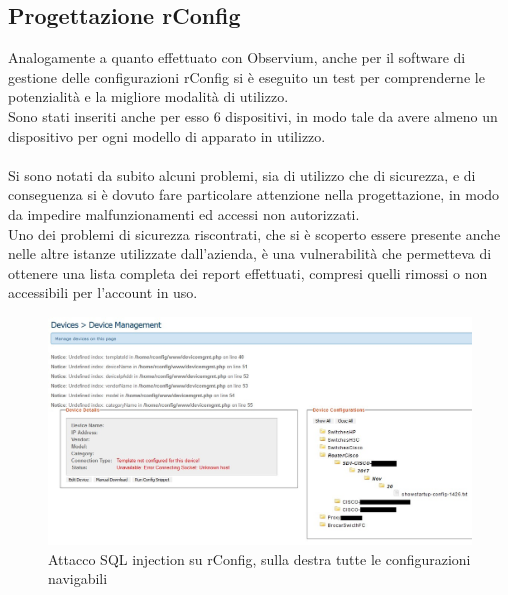 \documentclass[Realizzazione.tex]{subfiles}
\begin{document}
\subsection{Progettazione rConfig}
Analogamente a quanto effettuato con Observium, anche per il software di gestione delle configurazioni rConfig si è eseguito un test per comprenderne le potenzialità e la migliore modalità di utilizzo. \\
Sono stati inseriti anche per esso 6 dispositivi, in modo tale da avere almeno un dispositivo per ogni modello di apparato in utilizzo. \\\\
Si sono notati da subito alcuni problemi, sia di utilizzo che di sicurezza, e di conseguenza si è dovuto fare particolare attenzione nella progettazione, in modo da impedire malfunzionamenti ed accessi non autorizzati. \\
Uno dei problemi di sicurezza riscontrati, che si è scoperto essere presente anche nelle altre istanze utilizzate dall'azienda, è una vulnerabilità  che permetteva di ottenere una lista completa dei report effettuati, compresi quelli rimossi o non accessibili per l'account in uso. \\
\begin{figure}[H]
	\centering
	\includegraphics[width=1\linewidth]{"images/rConfig_SQLi"}
	\caption{Attacco SQL injection su rConfig, sulla destra tutte le configurazioni navigabili}
	\label{fig:Attacco SQL injection su rConfig, sulla destra tutte le configurazioni navigabili}
\end{figure}
\end{document}
